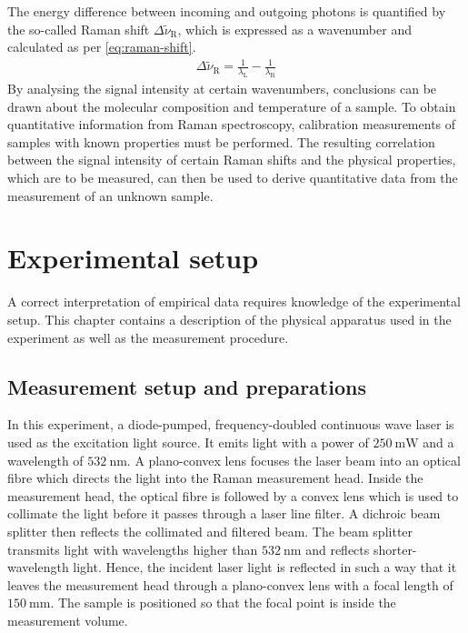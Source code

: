 
The energy difference between incoming and outgoing photons is quantified by the so-called Raman shift $\Delta\tilde{\nu}_\mathrm{R}$, which is expressed as a wavenumber and calculated as per \autoref{eq:raman-shift}.
\begin{align}
    \Delta\tilde{\nu}_\mathrm{R}=\frac{1}{\lambda_\mathrm{L}}-\frac{1}{\lambda_\mathrm{R}} \label{eq:raman-shift}
\end{align}
By analysing the signal intensity at certain wavenumbers, conclusions can be drawn about the molecular composition and temperature of a sample. To obtain quantitative information from Raman spectroscopy, calibration measurements of samples with known properties must be performed. The resulting correlation between the signal intensity of certain Raman shifts and the physical properties, which are to be measured, can then be used to derive quantitative data from the measurement of an unknown sample.


\chapter{Experimental setup}
\label{chap:experimental}

A correct interpretation of empirical data requires knowledge of the experimental setup. This chapter contains a description of the physical apparatus used in the experiment as well as the measurement procedure.

\section{Measurement setup and preparations}

In this experiment, a diode-pumped, frequency-doubled continuous wave laser is used as the excitation light source. It emits light with a power of $250~\mathrm{mW}$ and a wavelength of $532~\mathrm{nm}$. A plano-convex lens focuses the laser beam into an optical fibre which directs the light into the Raman measurement head. Inside the measurement head, the optical fibre is followed by a convex lens which is used to collimate the light before it passes through a laser line filter. A dichroic beam splitter then reflects the collimated and filtered beam. The beam splitter transmits light with wavelengths higher than $532~\mathrm{nm}$ and reflects shorter-wavelength light. Hence, the incident laser light is reflected in such a way that it leaves the measurement head through a plano-convex lens with a focal length of $150~\mathrm{mm}$. The sample is positioned so that the focal point is inside the measurement volume.


